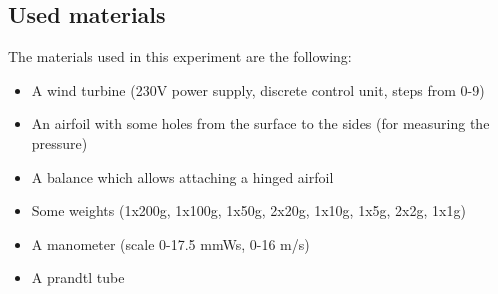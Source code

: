 \documentclass{scrreprt}
\begin{document}
\subsection{Used materials}
The materials used in this experiment are the following:
\begin{itemize}
\item A wind turbine (230V power supply, discrete control unit, steps from 0-9)
\item An airfoil with some holes from the surface to the sides (for measuring the pressure)
\item A balance which allows attaching a hinged airfoil
\item Some weights (1x200g, 1x100g, 1x50g, 2x20g, 1x10g, 1x5g, 2x2g, 1x1g)
\item A manometer (scale 0-17.5 mmWs, 0-16 m/s)
\item A prandtl tube
\end{itemize}
\end{document}
